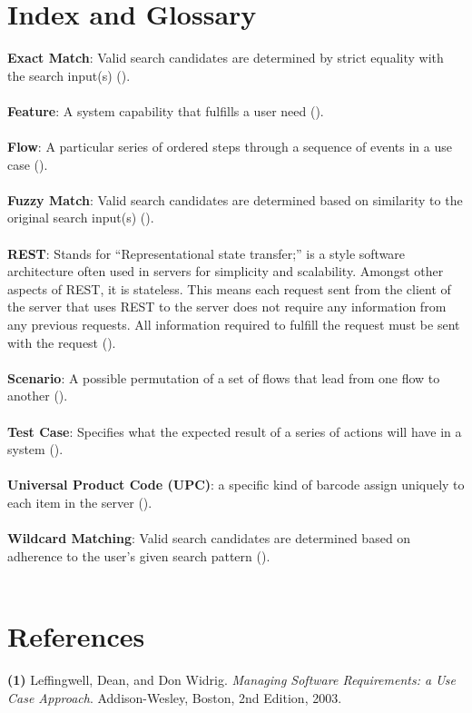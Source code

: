 \documentclass{article}
\begin{document}
\section{Index and Glossary}
\textbf{Exact Match}: Valid search candidates are determined by strict equality with the search input(s) (\pageref{exact}).\\ \\
\textbf{Feature}: A system capability that fulfills a user need (\pageref{feature}).\\ \\
\textbf{Flow}: A particular series of ordered steps through a sequence of events in a use case (\pageref{flow}).\\ \\
\textbf{Fuzzy Match}: Valid search candidates are determined based on similarity to the original search input(s) (\pageref{fuzzy}).\\ \\
\textbf{REST}: Stands for ``Representational state transfer;'' is a style software architecture often used in servers for simplicity and scalability. Amongst other aspects of REST, it is stateless. This means each request sent from the client of the server that uses REST to the server does not require any information from any previous requests. All information required to fulfill the request must be sent with the request (\pageref{rest}).\\ \\
\textbf{Scenario}: A possible permutation of a set of flows that lead from one flow to another (\pageref{scenario}).\\ \\
\textbf{Test Case}: Specifies what the expected result of a series of actions will have in a system (\pageref{test_case}).\\ \\
\textbf{Universal Product Code (UPC)}: a specific kind of barcode assign uniquely to each item in the server (\pageref{upc}).\\ \\
\textbf{Wildcard Matching}: Valid search candidates are determined based on adherence to the user's given search pattern (\pageref{wild}).\\ \\

\section{References}
\hangindent=1.4cm
\textbf{(1)} Leffingwell, Dean, and Don Widrig.
\emph{Managing Software Requirements: a Use Case Approach}.
Addison-Wesley, Boston,
2nd Edition,
2003.\\
\end{document}
